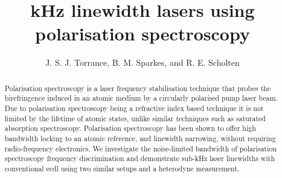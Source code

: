 \documentclass[10pt,letterpaper]{article}
\begin{document}
\title{kHz linewidth lasers using polarisation spectroscopy}
\author{J. S. J. Torrance, B. M. Sparkes, and R. E. Scholten}
\address{School of Physics, The University of Melbourne, Melbourne, Victoria 3010 Australia}



\begin{abstract}
Polarisation spectroscopy is a laser frequency stabilisation technique that probes the birefringence induced in an atomic medium by a circularly polarised pump laser beam. Due to polarisation spectroscopy being a refractive index based technique it is not limited by the lifetime of atomic states, unlike similar techniques such as saturated absorption spectroscopy. Polarisation spectroscopy has been shown to offer high bandwidth locking to an atomic reference, and linewidth narrowing, without requiring radio-frequency electronics. We investigate the noise-limited bandwidth of polarisation spectroscopy frequency discrimination and demonstrate sub-kHz laser linewidths with conventional \gls*{ecdl} using two similar setups and a heterodyne measurement.
\end{abstract}


\end{document}
